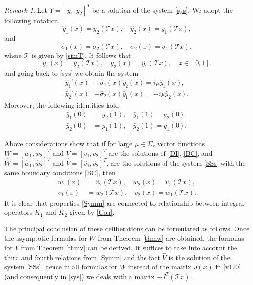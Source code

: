 \documentclass[11pt]{amsart}
\theoremstyle{plain}
\theoremstyle{definition}
\theoremstyle{remark}
\newtheorem{rem}[thm]{Remark}
\numberwithin{equation}{section}
\begin{document}
\begin{rem}
Let $Y=[y_1,y_2]^T$ be a solution of the system \eqref{sys}.
We adopt the following notation
\[
\hat{y}_1(x)=y_2(\mathcal{T}x),\quad \hat{y}_2(x)=y_1(\mathcal{T}x),
\]
and
\[
\hat{\sigma}_1(x)=\sigma_2(\mathcal{T}x),\quad \hat{\sigma}_2(x)=\sigma_1(\mathcal{T}x),
\]
where $\mathcal{T}$ is given by \eqref{simT}.
It follows that
\[
y_1(x)=\hat{y}_2(\mathcal{T}x),\quad y_2(x)=\hat{y}_1(\mathcal{T}x),\quad x\in [0,1].
\]
and going back to \eqref{sys} we obtain the system
\begin{align}\label{SSs}
\hat{y}_1'(x)&-\hat{\sigma}_1(x)\hat{y}_2(x)=i\mu\hat{y}_1(x),\\
\hat{y}_2'(x)&-\hat{\sigma}_2(x)\hat{y}_1(x)=-i\mu\hat{y}_2(x).\nonumber
\end{align}
Moreover, the following identities hold
\begin{align*}
 \hat{y}_1(0)&=y_2(1),\quad \hat{y}_1(1)=y_2(0),\\
\hat{y}_2(0)&=y_1(1),\quad \hat{y}_2(1)=y_1(0).
\end{align*}

Above considerations show that if for large $\mu\in \Sigma_r$ vector functions
$W=[w_1,w_2]^T$ and
$V=[v_1,v_2]^T$ are the solutions of \eqref{DI}, \eqref{BC},
and  $\hat{W}=[\hat{w}_1,\hat{w}_2]^T$ and
$\hat{V}=[\hat{v}_1,\hat{v}_2]^T$,
are the solutions of the system \eqref{SSs} with the same boundary conditions \eqref{BC}, then
\begin{align}\label{Symm}
w_1(x)&=\hat{v}_2(\mathcal{T}x),\quad w_2(x)=\hat{v}_1(\mathcal{T}x),
\\
v_1(x)&=\hat{w}_2(\mathcal{T}x),\quad v_2(x)=\hat{w}_1(\mathcal{T}x).\nonumber
\end{align}
It is clear that properties \eqref{Symm} are connected to
relationship between integral operators $K_1$ and $K_2$ given by \eqref{Con}.

The principal conclusion of these deliberations can be formulated as follows. Once
the asymptotic formulas for $W$ from Theorem  \ref{thmw} are obtained, the formulas for $V$
from Theorem \ref{thmv} can be derived.
It suffices to take into account the third and fourth relations from  \eqref{Symm}
and the fact $\hat{V}$ is the solution of the system \eqref{SSs}, hence in all formulas for
$W$ instead of the matrix $J(x)$ in \eqref{v120} (and consequently in \eqref{sys}) we deals with a matrix $-J^T(\mathcal{T}x)$.
\end{rem}
\end{document}

